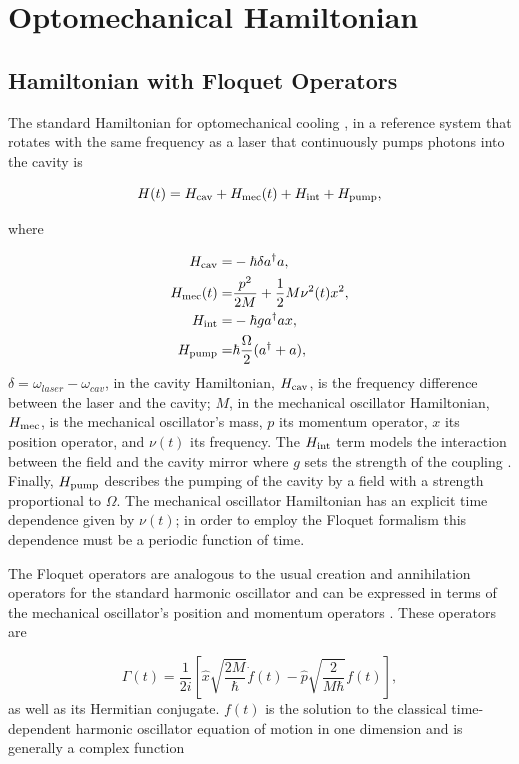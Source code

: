 \documentclass[reprint, amsmath,amssymb, aps,pra]{revtex4-1}
\begin{document}
\section{Optomechanical Hamiltonian}\label{OptmechH}
\subsection{Hamiltonian with Floquet Operators}
	
The standard Hamiltonian for optomechanical cooling \cite{LCNooshi}, in
a reference system that rotates with the same frequency as a laser
that continuously pumps photons into the cavity is

\begin{equation}
H(t) =   H_{\rm cav} + H_{\rm mec}(t) + H_{\rm int} + H_{\rm pump},
\end{equation}

where

\begin{align}
H_{\rm cav} =& -\hbar \delta a^\dagger a,\\
H_{\rm mec}(t) =& \frac{p^2}{2M} + \frac{1}{2}M \nu^2 (t) x^2,\\
H_{\rm int} =& -\hbar g a^\dagger a x,\\
H_{\rm pump} =& \hbar\frac{\Omega}{2}(a^\dagger + a),
\end{align}
$\delta = \omega_{laser} - \omega_{cav}$, in the cavity Hamiltonian, $H_{\rm cav}$, is the frequency difference between the laser and
the cavity; $M$, in the mechanical oscillator Hamiltonian,
$H_{\rm mec}$, is the mechanical oscillator's mass, $p$ its momentum
operator, $x$ its position operator, and $\nu(t)$ its frequency. The
$H_{\rm int}$ term models the interaction between the field and the cavity
mirror where $g$ sets the strength of the coupling \cite{KippenberCO}.
Finally, $H_{\rm pump}$ describes the pumping of the cavity by a field with
a strength proportional to $\Omega$. The mechanical oscillator Hamiltonian has an explicit time dependence given by
$\nu(t)$; in order to employ the Floquet formalism this dependence must be a
periodic function of time.

The Floquet operators are analogous to the usual creation and
annihilation operators for the standard harmonic oscillator and can be
expressed in terms of the mechanical oscillator's position and
momentum operators \cite{HanngiFM}. These operators are

\begin{equation}\label{FloquetOperators}
\Gamma(t) = \frac{1}{2i}\left[\hat{x}\sqrt{\frac{2M}{\hbar}}\dot{f}(t)-\hat{p}\sqrt{\frac{2}{M \hbar }}f(t)\right],
\end{equation} as well as its Hermitian conjugate. $f(t)$ is the solution to the classical time-dependent harmonic oscillator equation of motion in one dimension and is generally a complex function \cite{BrownPT}
\end{document}
